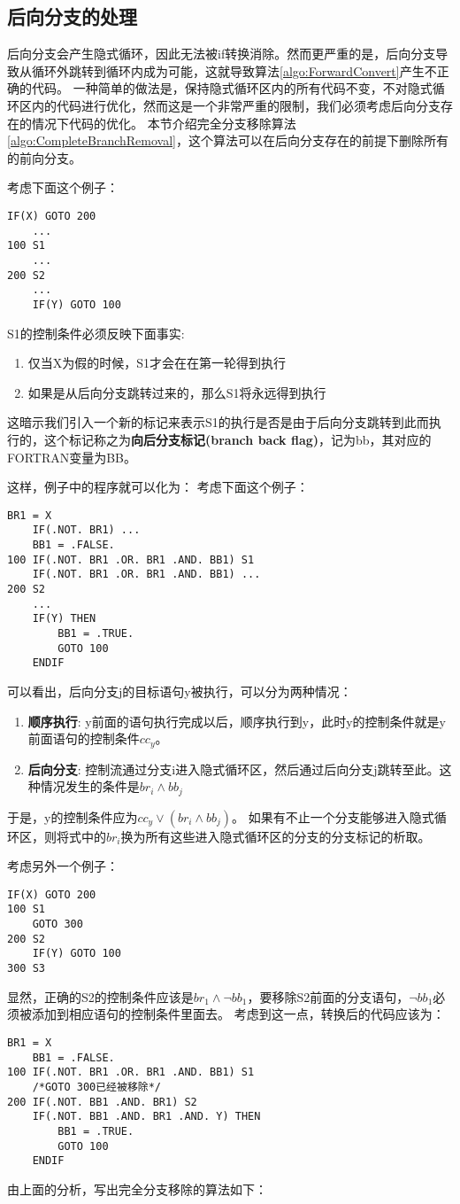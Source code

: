 \subsection{后向分支的处理}
后向分支会产生隐式循环，因此无法被if转换消除。然而更严重的是，后向分支导致从循环外跳转到循环内成为可能，这就导致算法\ref{algo:ForwardConvert}产生不正确的代码。
一种简单的做法是，保持隐式循环区内的所有代码不变，不对隐式循环区内的代码进行优化，然而这是一个非常严重的限制，我们必须考虑后向分支存在的情况下代码的优化。
本节介绍完全分支移除算法\ref{algo:CompleteBranchRemoval}，这个算法可以在后向分支存在的前提下删除所有的前向分支。

考虑下面这个例子：
\begin{lstlisting}[language=FORTRAN]
	IF(X) GOTO 200
	...
100	S1
	...
200	S2
	...
	IF(Y) GOTO 100
\end{lstlisting}

S1的控制条件必须反映下面事实:
\begin{enumerate}
\item 仅当X为假的时候，S1才会在在第一轮得到执行
\item 如果是从后向分支跳转过来的，那么S1将永远得到执行
\end{enumerate}
这暗示我们引入一个新的标记来表示S1的执行是否是由于后向分支跳转到此而执行的，这个标记称之为\textbf{向后分支标记(branch back flag)}，记为bb，其对应的FORTRAN变量为BB。

这样，例子中的程序就可以化为：
考虑下面这个例子：
\begin{lstlisting}[language=FORTRAN]
	BR1 = X
	IF(.NOT. BR1) ...
	BB1 = .FALSE.
100	IF(.NOT. BR1 .OR. BR1 .AND. BB1) S1
	IF(.NOT. BR1 .OR. BR1 .AND. BB1) ...
200	S2
	...
	IF(Y) THEN
		BB1 = .TRUE.
		GOTO 100
	ENDIF
\end{lstlisting}

可以看出，后向分支j的目标语句y被执行，可以分为两种情况：
\begin{enumerate}
\item \textbf{顺序执行}:
y前面的语句执行完成以后，顺序执行到y，此时y的控制条件就是y前面语句的控制条件$cc_y$。
\item \textbf{后向分支}:
控制流通过分支i进入隐式循环区，然后通过后向分支j跳转至此。这种情况发生的条件是$br_i\wedge bb_j$
\end{enumerate}
于是，y的控制条件应为$cc_y\vee\left(br_i\wedge bb_j\right)$。
如果有不止一个分支能够进入隐式循环区，则将式中的$br_i$换为所有这些进入隐式循环区的分支的分支标记的析取。

考虑另外一个例子：
\begin{lstlisting}[language=FORTRAN]
	IF(X) GOTO 200
100	S1
	GOTO 300
200	S2
	IF(Y) GOTO 100
300	S3
\end{lstlisting}
显然，正确的S2的控制条件应该是$br_1\wedge \neg bb_1$，要移除S2前面的分支语句，$\neg bb_1$必须被添加到相应语句的控制条件里面去。
考虑到这一点，转换后的代码应该为：
\begin{lstlisting}[language=FORTRAN]
	BR1 = X
	BB1 = .FALSE.
100	IF(.NOT. BR1 .OR. BR1 .AND. BB1) S1
	/*GOTO 300已经被移除*/
200	IF(.NOT. BB1 .AND. BR1) S2
	IF(.NOT. BB1 .AND. BR1 .AND. Y) THEN
		BB1 = .TRUE.
		GOTO 100
	ENDIF
\end{lstlisting}
由上面的分析，写出完全分支移除的算法如下：

